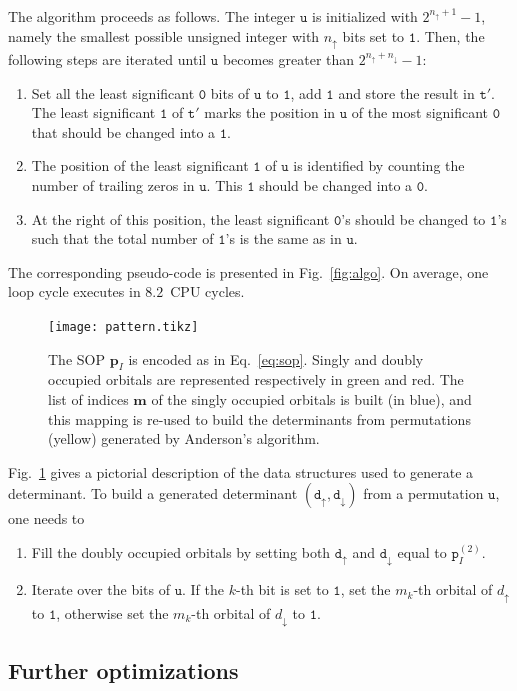 \documentclass[aip,jcp,reprint,showkeys]{revtex4-1}
\newcommand{\tu}{\mathtt{u}}
\newcommand{\ttt}{\mathtt{t}}
\newcommand{\md}{\mathtt{d}}
\newcommand{\mpp}{\mathtt{p}}
\newcommand{\mpv}{\mathbf{p}}
\newcommand{\up}{\uparrow}
\newcommand{\dn}{\downarrow}
\newcommand{\one}{{\texttt{1}}}
\newcommand{\zero}{{\texttt{0}}}
\newcommand{\sop}{SOP}
\newcommand{\cpu}{CPU}
\begin{document}
The algorithm proceeds as follows. The integer $\tu$ is initialized with
$2^{n_\up+1}-1$, namely the smallest possible unsigned integer with $n_\up$
bits set to $\one$. 
Then, the following steps are iterated until $\tu$ becomes
greater than $2^{n_\up+n_\dn}-1$:
\begin{enumerate}
    \item Set all the least significant $\zero$ bits of $\tu$ to $\one$, add $\one$ and store the result in $\ttt'$. The least significant $\one$ of $\ttt'$ marks the position in $\tu$ of the most significant $\zero$ that should be changed into a $\one$.
    \item The position of the least significant $\one$ of $\tu$ is identified by counting the number of trailing zeros in $\tu$. This $\one$ should be changed into a $\zero$.
    \item At the right of this position, the least significant $\zero$'s should be changed to $\one$'s such that the total number of $\one$'s is the same as in $\tu$.
\end{enumerate}
The corresponding pseudo-code is presented in Fig.~\ref{fig:algo}. On average, one loop cycle executes in $8.2$~{\cpu} cycles.

\begin{figure}[t]
\texttt{[image: pattern.tikz]} 
\caption{The {\sop} $\mpv_I$ is encoded as in Eq.~\eqref{eq:sop}. Singly and doubly
occupied orbitals are represented respectively in green and red.
The list of indices $\mathbf{m}$ of the singly occupied orbitals is built (in blue), and this
mapping is re-used to build the determinants from permutations (yellow) generated by Anderson's algorithm.}
\label{fig:mapping}
\end{figure}

Fig.~\ref{fig:mapping} gives a pictorial description of the data structures used to generate a determinant.
To build a generated determinant $(\md_\up,\md_\dn)$ from a permutation $\tu$, one needs to
\begin{enumerate}
    \item Fill the doubly occupied orbitals by setting both $\md_\up$ and $\md_\dn$
          equal to $\mpp_I^{(2)}$.
    \item Iterate over the bits of $\tu$. If the $k$-th bit is set to $\one$,
          set the $m_k$-th orbital of $d_\up$ to $\one$, otherwise set the $m_k$-th orbital
          of $d_\dn$ to $\one$.
\end{enumerate}

\subsection{Further optimizations}
\end{document}
